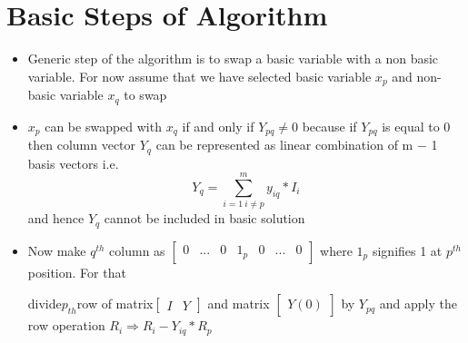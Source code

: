 \documentclass[twoside]{article}
\begin{document}
%
%
\section{Basic Steps of Algorithm}
\begin{itemize}
\item Generic step of the algorithm is to swap a basic variable with a non basic variable. For now assume
that we have selected basic variable $x_p$ and non-basic variable $x_q$ to swap
\item $x_p$ can be swapped with $x_q$ if and only if $Y_{pq} \ne 0$ because if $Y_{pq}$ is equal to 0 then column vector $Y_q$
can be represented as linear combination of m − 1 basis vectors i.e.
\[ Y_q=\sum_{i=1~i \neq p}^m y_{iq} \ast I_i\]
and hence $Y_q$ cannot be included in basic solution
\item Now make $q^{th}$ column as $ \left[ \begin{array}{ccccccc}
 0 & ... & 0 & 1_p & 0 & ... & 0
  \end{array} \right]$ where $1_p$
  signifies 1 at
  $p^{th}$
  position. For that

 divide$p_{th}$row of matrix$ \left[ \begin{array}{cc}
I &
Y  \end{array} \right]$
and matrix $ \left[ \begin{array}{cc}
Y(0) \end{array} \right]$
by
$Y_{pq}$ and apply the row operation $R_i \Rightarrow R_i - Y_{iq} \ast R_p$
\end{itemize}
\end{document}
